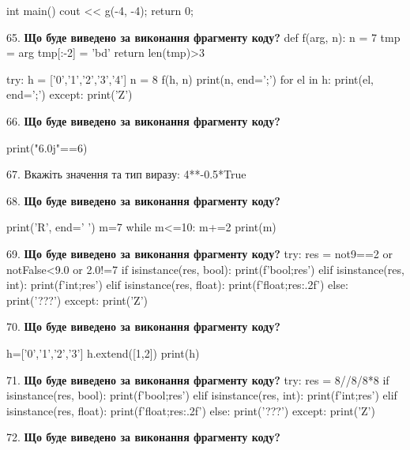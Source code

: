 \documentclass[11pt]{article}
\begin{document}
int main(){
    cout << g(-4, -4);
    return 0;
}
\par\vspace{5mm}
65. \textbf{Що буде виведено за виконання фрагменту коду?}
def f(arg, n):
    n = 7
    tmp = arg
    tmp[:-2] = 'bd'
    return len(tmp)>3

try:
    h = ['0','1','2','3','4']
    n = 8
    f(h, n)
    print(n, end=';')
    for el in h:
        print(el, end=';')
except:
    print('Z')
\par\vspace{5mm}
66. \textbf{Що буде виведено за виконання фрагменту коду?}

print("6.0j"==6)
\par\vspace{5mm}
67. 
Вкажіть значення та тип виразу:
4**-0.5*True
\par\vspace{5mm}
68. \textbf{Що буде виведено за виконання фрагменту коду?}

print('R', end=' ')
m=7
while m<=10:
    m+=2
print(m)

\par\vspace{5mm}
69. \textbf{Що буде виведено за виконання фрагменту коду?}
try:
    res = not9==2 or notFalse<9.0 or 2.0!=7
    if isinstance(res, bool):
        print(f'bool;{res}')
    elif isinstance(res, int):
        print(f'int;{res}')
    elif isinstance(res, float):
        print(f'float;{res:.2f}')
    else:
        print('???')
except:
    print('Z')
\par\vspace{5mm}
70. \textbf{Що буде виведено за виконання фрагменту коду?}

h=['0','1','2','3']
h.extend([1,2])
print(h)

\par\vspace{5mm}
71. \textbf{Що буде виведено за виконання фрагменту коду?}
try:
    res = 8//8/8*8
    if isinstance(res, bool):
        print(f'bool;{res}')
    elif isinstance(res, int):
        print(f'int;{res}')
    elif isinstance(res, float):
        print(f'float;{res:.2f}')
    else:
        print('???')
except:
    print('Z')
\par\vspace{5mm}
72. \textbf{Що буде виведено за виконання фрагменту коду?}
\end{document}
